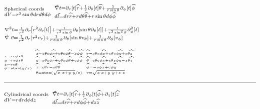 \documentclass{article}
\newcommand{\YgorUD}[2]{\,\!^{#1}_{#2}}
\begin{document}
\begin{multicols}{2}
$\YgorUD{%
        \text{Spherical coords}%
    }{%
        dV=r^{2}\sin\theta drd\theta d\phi%
    }$%
    \hfill\textbullet\hfill%
    $\YgorUD{%
        \vec{\nabla}t=\partial_{r}[t]\widehat{r}+\frac{1}{r}\partial_{\theta}[t]\widehat{\theta}%
        +\frac{1}{r\sin\theta} \partial_{\phi}[t] \widehat{\phi}%
    }{%
        d\vec{l}=dr\widehat{r}+rd\theta\widehat{\theta}+r\sin\theta d\phi\widehat{\phi}%
    }$

$\YgorUD{%
        \nabla^{2}t=\frac{1}{r^{2}}\partial_{r}\left[r^{2}\partial_{r}[t]\right] + %
        \frac{1}{r^{2}\sin\theta} \partial_{\theta}%
        \left[\sin\theta\partial_{\theta}[t]\right] + %
        \frac{1}{r^{2}\sin^{2}\theta}\partial^{2}_{\phi}[t]%
    }{%
        \vec{\nabla}\cdot\vec{v}=\frac{1}{r^{2}}\partial_{r}\left[r^{2}v_{r}\right] + %
        \frac{1}{r\sin\theta} \partial_{\theta}%
        \left[\sin\theta v_{\theta}\right] + %
        \frac{1}{r\sin\theta}\partial_{\phi}[v_{\phi}]%
    }$

$\YgorUD{%
        \YgorUD{%
            x=rc \phi s \theta %
        }{%
            y=rs \phi s \theta %
        }%
    }{%
        \YgorUD{%
            z=rc \theta %
        }{%
            \phi = \text{atan}(y/x)%
        }%
    }$%
    \hfill\textbullet\hfill%
    $\YgorUD{%
        \YgorUD{%
            \widehat{x}=s \theta c \phi \widehat{r} + %
                    c \theta c \phi \widehat{\theta} - %
                    s \phi \widehat{\phi}%
        }{%
            \widehat{y}=s \theta s \phi \widehat{r} + %
                    c \theta s \phi \widehat{\theta} + %
                    c \phi \widehat{\phi}%
        }%
    }{%
        \YgorUD{%
            \widehat{z}=c \theta \widehat{r} - %
                s \theta \widehat{\theta}%
        }{%
            \theta = \text{atan}(\sqrt{x\cdot x+y\cdot y}/z)%
        }%
    }$%
    \hfill\textbullet\hfill%
    $\YgorUD{%
        \YgorUD{%
            \widehat{r}=s \theta c \phi \widehat{x} + %
                    s \theta s \phi \widehat{y} + %
                    c \theta \widehat{z}%
        }{%
            \widehat{\theta}=c \theta c \phi \widehat{x} + %
                    c \theta s \phi \widehat{y} - %
                    s \theta \widehat{z}%
        }%
    }{%
        \YgorUD{%
            \widehat{\phi}=-s \phi \widehat{x} + c \phi \widehat{y}%
        }{%
            r = \sqrt{x\cdot x+y\cdot y+z\cdot z}%
        }%
    }$
\hrule

$\YgorUD{%
        \text{Cylindrical coords}%
    }{%
        dV=r drd\phi dz%
    }$%
    \hfill\textbullet\hfill%
    $\YgorUD{%
        \vec{\nabla}t=\partial_{r}[t]\widehat{r} + %
        \frac{1}{r}\partial_{\phi}[t]\widehat{\phi} + %
        \partial_{z}[t] \widehat{z}%
    }{%
        d\vec{l}=dr\widehat{r}+rd\phi\widehat{\phi}+dz\widehat{z}%
    }$


\end{multicols}
\end{document}
